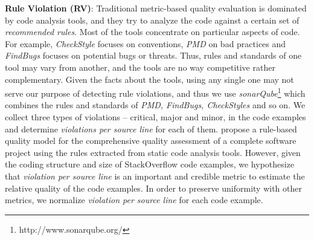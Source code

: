 \documentclass{sig-alternate}
\begin{document}
\textbf{Rule Violation (RV)}: Traditional metric-based quality evaluation is dominated by code analysis tools, and they try to analyze the code against a certain set of \emph{ recommended rules}. Most of the tools concentrate on  particular aspects of code. For example, \emph{CheckStyle} focuses on conventions, \emph{PMD} on bad practices and \emph{FindBugs} focuses on potential bugs or threats. Thus, rules and standards of one tool may vary from another, and the tools are no way competitive rather complementary. Given the facts about the tools, using any single one may not serve our purpose of detecting rule violations, and thus we use \emph{sonarQube}\footnote{http://www.sonarqube.org/} which combines the rules and standards of \emph{PMD, FindBugs, CheckStyles} and so on. We collect three types of violations -- critical, major and minor, in the code examples and determine \emph{violations per source line} for each of them. \citet{lochmann} propose a rule-based quality model for the comprehensive quality assessment of a complete software project using the rules extracted from static code analysis tools. However, given the coding structure and size of StackOverflow code examples, we hypothesize that \emph{violation per source line} is an important and credible metric to estimate the relative quality of the code examples. In order to preserve uniformity with other metrics, we normalize \emph{violation per source line} for each code example.
\vspace{-.1cm}
\end{document}
